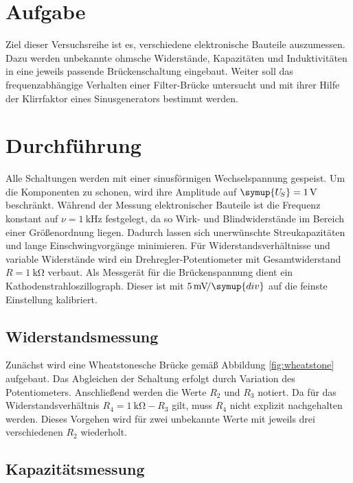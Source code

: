 \section{Aufgabe}

Ziel dieser Versuchsreihe ist es, verschiedene elektronische Bauteile auszumessen. Dazu werden unbekannte
ohmsche Widerstände, Kapazitäten und Induktivitäten in eine jeweils passende Brückenschaltung eingebaut.
Weiter soll das frequenzabhängige Verhalten einer Filter-Brücke untersucht und mit ihrer Hilfe der
Klirrfaktor eines Sinusgenerators bestimmt werden.


\section{Durchführung}
\label{sec:durchführung}

Alle Schaltungen werden mit einer sinusförmigen Wechselspannung gespeist. Um die Komponenten zu
schonen, wird ihre Amplitude auf $\symup{U_{\! S}} = \qty{1}{\volt}$ beschränkt. Während der Messung
elektronischer Bauteile ist die Frequenz konstant auf $\nu = \qty{1}{\kilo\hertz}$ festgelegt, da so
Wirk- und Blindwiderstände im Bereich einer Größenordnung liegen. Dadurch lassen sich unerwünschte
Streukapazitäten und lange Einschwingvorgänge minimieren. Für Widerstandsverhältnisse und variable
Widerstände wird ein Drehregler-Potentiometer mit Gesamtwiderstand $R = \qty{1}{\kilo\ohm}$ verbaut.
Als Messgerät für die Brückenspannung dient ein Kathodenstrahloszillograph. Dieser ist mit
$\qty{5}{\milli\volt} \! / \symup{div}$ auf die feinste Einstellung kalibriert.

\subsection{Widerstandsmessung}

Zunächst wird eine Wheatstonesche Brücke gemäß Abbildung \ref{fig:wheatstone} aufgebaut. Das Abgleichen
der Schaltung erfolgt durch Variation des Potentiometers. Anschließend werden die Werte $R_2$ und $R_3$
notiert. Da für das Widerstandsverhältnis $R_4 = \qty{1}{\kilo\ohm} - \! R_3$ gilt, muss $R_4$ nicht explizit
nachgehalten werden. Dieses Vorgehen wird für zwei unbekannte Werte mit jeweils drei verschiedenen $R_2$
wiederholt.

\subsection{Kapazitätsmessung}

